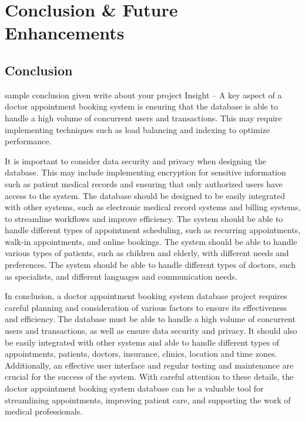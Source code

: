\chapter{Conclusion \& Future Enhancements}
\section{Conclusion}
sample conclusion given
write about your project
Insight – A key aspect of a doctor appointment booking system is ensuring that the database is able to handle a high volume of concurrent users and transactions. This may require implementing techniques such as load balancing and indexing to optimize performance.

It is important to consider data security and privacy when designing the database. This may include implementing encryption for sensitive information such as patient medical records and ensuring that only authorized users have access to the system.
The database should be designed to be easily integrated with other systems, such as electronic medical record systems and billing systems, to streamline workflows and improve efficiency.
The system should be able to handle different types of appointment scheduling, such as recurring appointments, walk-in appointments, and online bookings.
The system should be able to handle various types of patients, such as children and elderly, with different needs and preferences.
The system should be able to handle different types of doctors, such as specialists, and different languages and communication needs.

In conclusion, a doctor appointment booking system database project requires careful planning and consideration of various factors to ensure its effectiveness and efficiency. The database must be able to handle a high volume of concurrent users and transactions, as well as ensure data security and privacy. It should also be easily integrated with other systems and able to handle different types of appointments, patients, doctors, insurance, clinics, location and time zones. Additionally, an effective user interface and regular testing and maintenance are crucial for the success of the system. With careful attention to these details, the doctor appointment booking system database can be a valuable tool for streamlining appointments, improving patient care, and supporting the work of medical professionals.

